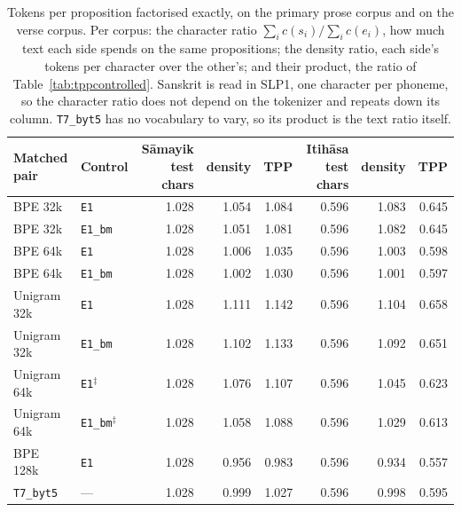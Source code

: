 \begin{table}[t]
\centering
\setlength{\tabcolsep}{4.0pt}
\scriptsize
\begin{tabular}{llrrrrrr}
\toprule
Matched pair & Control & S\=amayik test chars & density & TPP & Itih\=asa test chars & density & TPP \\
\midrule
BPE 32k & \texttt{E1} & 1.028 & 1.054 & 1.084 & 0.596 & 1.083 & 0.645 \\
BPE 32k & \texttt{E1\_bm} & 1.028 & 1.051 & 1.081 & 0.596 & 1.082 & 0.645 \\
BPE 64k & \texttt{E1} & 1.028 & 1.006 & 1.035 & 0.596 & 1.003 & 0.598 \\
BPE 64k & \texttt{E1\_bm} & 1.028 & 1.002 & 1.030 & 0.596 & 1.001 & 0.597 \\
Unigram 32k & \texttt{E1} & 1.028 & 1.111 & 1.142 & 0.596 & 1.104 & 0.658 \\
Unigram 32k & \texttt{E1\_bm} & 1.028 & 1.102 & 1.133 & 0.596 & 1.092 & 0.651 \\
Unigram 64k & \texttt{E1}$^{\ddagger}$ & 1.028 & 1.076 & 1.107 & 0.596 & 1.045 & 0.623 \\
Unigram 64k & \texttt{E1\_bm}$^{\ddagger}$ & 1.028 & 1.058 & 1.088 & 0.596 & 1.029 & 0.613 \\
BPE 128k & \texttt{E1} & 1.028 & 0.956 & 0.983 & 0.596 & 0.934 & 0.557 \\
\texttt{T7\_byt5} & --- & 1.028 & 0.999 & 1.027 & 0.596 & 0.998 & 0.595 \\
\bottomrule
\end{tabular}
\caption{Tokens per proposition factorised exactly, on the primary prose corpus and on the verse corpus. Per corpus: the character ratio $\sum_i c(s_i) / \sum_i c(e_i)$, how much text each side spends on the same propositions; the density ratio, each side's tokens per character over the other's; and their product, the ratio of Table~\ref{tab:tppcontrolled}. Sanskrit is read in SLP1, one character per phoneme, so the character ratio does not depend on the tokenizer and repeats down its column. \texttt{T7\_byt5} has no vocabulary to vary, so its product is the text ratio itself.}
\label{tab:decomposition}
\end{table}
